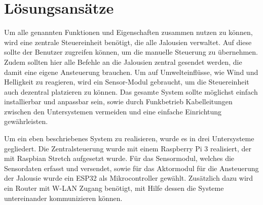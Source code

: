 \section{Lösungsansätze}
Um alle genannten Funktionen und Eigenschaften zusammen nutzen zu können, wird eine zentrale Steuereinheit benötigt, die alle Jalousien verwaltet. Auf diese sollte der Benutzer zugreifen können, um die manuelle Steuerung zu übernehmen. Zudem sollten hier alle Befehle an die Jalousien zentral gesendet werden, die damit eine eigene Ansteuerung brauchen. Um auf Umwelteinflüsse, wie Wind und Helligkeit zu reagieren, wird ein Sensor-Modul gebraucht, um die Steuereinheit auch dezentral platzieren zu können. Das gesamte System sollte möglichst einfach installierbar und anpassbar sein, sowie durch Funkbetrieb Kabelleitungen zwischen den Untersystemen vermeiden und eine einfache Einrichtung gewährleisten.

Um ein eben beschriebenes System zu realisieren, wurde es in drei Untersysteme gegliedert. Die Zentralsteuerung wurde mit einem Raspberry Pi 3 realisiert, der mit Raspbian Stretch aufgesetzt wurde. Für das Sensormodul, welches die Sensordaten erfasst und versendet, sowie für das Aktormodul für die Ansteuerung der Jalousie wurde ein ESP32 als Mikrocontroller gewählt. Zusätzlich dazu wird ein Router mit W-LAN Zugang benötigt, mit Hilfe dessen die Systeme untereinander kommunizieren können.